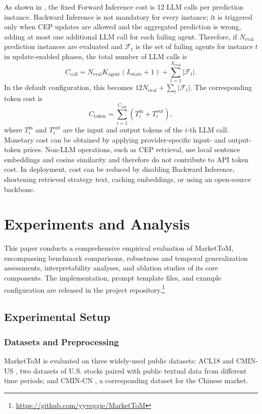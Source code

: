 \documentclass[a4paper,fleqn,doubleblind]{cas-sc}
\newcommand{\revise}[1]{{\color{blue}#1}}
\begin{document}
{As shown in , the fixed Forward Inference cost is 12 LLM calls per prediction instance. Backward Inference is not mandatory for every instance; it is triggered only when CEP updates are allowed and the aggregated prediction is wrong, adding at most one additional LLM call for each failing agent. Therefore, if $N_{\mathrm{eval}}$ prediction instances are evaluated and $\mathcal{F}_t$ is the set of failing agents for instance $t$ in update-enabled phases, the total number of LLM calls is
\begin{equation}
C_{\mathrm{call}} = N_{\mathrm{eval}}K_{\mathrm{agent}}(L_{\mathrm{state}}+1) + \sum_{t=1}^{N_{\mathrm{eval}}} |\mathcal{F}_t|.
\end{equation}
In the default configuration, this becomes $12N_{\mathrm{eval}}+\sum_t|\mathcal{F}_t|$. The corresponding token cost is
\begin{equation}
C_{\mathrm{token}} = \sum_{i=1}^{C_{\mathrm{call}}} (T_i^{\mathrm{in}} + T_i^{\mathrm{out}}),
\end{equation}
where $T_i^{\mathrm{in}}$ and $T_i^{\mathrm{out}}$ are the input and output tokens of the $i$-th LLM call. Monetary cost can be obtained by applying provider-specific input- and output-token prices. Non-LLM operations, such as CEP retrieval, use local sentence embeddings and cosine similarity and therefore do not contribute to API token cost. In deployment, cost can be reduced by disabling Backward Inference, shortening retrieved strategy text, caching embeddings, or using an open-source backbone.
}


\section{Experiments and Analysis}\label{sec:experiments}
This paper conducts a comprehensive empirical evaluation of MarketToM, encompassing benchmark comparisons, robustness and temporal generalization assessments, interpretability analyses, and ablation studies of its core components. \revise{The implementation, prompt template files, and example configuration are released in the project repository.\footnote{\url{https://github.com/yyveggie/MarketToM}}}


\subsection{Experimental Setup}
\subsubsection{Datasets and Preprocessing}
MarketToM is evaluated on three widely-used public datasets: {ACL18} \citep{xu2018stock} and {CMIN-US} \citep{luo2023causality}, two datasets of U.S. stocks paired with public textual data from different time periods; and {CMIN-CN} \citep{luo2023causality}, a corresponding dataset for the Chinese market.
\end{document}
